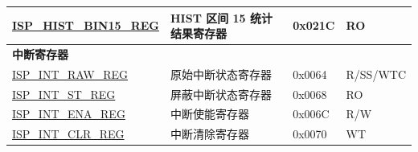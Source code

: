\begin{longtable}{ | p{6cm} | p{7.2cm} | p{1.3cm} | p{1cm} | }
\hyperref[regdesc:ISPHISTBIN15REG]{ISP\_HIST\_BIN15\_REG} & HIST 区间 15 统计结果寄存器 & 0x021C & RO \\ \hline
\multicolumn{4}{|l|}{\textbf{中断寄存器}} \\ \hline
\hyperref[regdesc:ISPINTRAWREG]{ISP\_INT\_RAW\_REG} & 原始中断状态寄存器 & 0x0064 & R/SS/WTC \\ \hline
\hyperref[regdesc:ISPINTSTREG]{ISP\_INT\_ST\_REG} & 屏蔽中断状态寄存器 & 0x0068 & RO \\ \hline
\hyperref[regdesc:ISPINTENAREG]{ISP\_INT\_ENA\_REG} & 中断使能寄存器 & 0x006C & R/W \\ \hline
\hyperref[regdesc:ISPINTCLRREG]{ISP\_INT\_CLR\_REG} & 中断清除寄存器 & 0x0070 & WT \\ \hline
\end{longtable}
